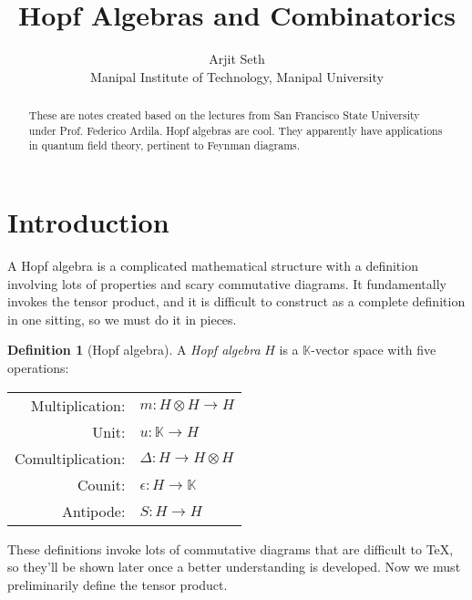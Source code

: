 \documentclass{article}
\theoremstyle{definition}
\newtheorem{Definition}{Definition}
\theoremstyle{remark}
\begin{document}
\title{\textbf{Hopf Algebras and Combinatorics}}

\author{\small Arjit Seth \\ \small Manipal Institute of Technology, Manipal University}
\date{}
\maketitle

\renewcommand{\abstractname}{Context}
\begin{abstract}
These are notes created based on the lectures from San Francisco State University under Prof. Federico Ardila. Hopf algebras are cool. They apparently have applications in quantum field theory, pertinent to Feynman diagrams.
\end{abstract}

\begingroup
\let\clearpage\relax
\tableofcontents
\endgroup

\medskip
\medskip

\section{Introduction}\label{sec:Intro}
A Hopf algebra is a complicated mathematical structure with a definition involving lots of properties and scary commutative diagrams. It fundamentally invokes the tensor product, and it is difficult to construct as a complete definition in one sitting, so we must do it in pieces.

\begin{Definition}[Hopf algebra]\label{def:HopfAlg}
A \emph{Hopf algebra} $H$ is a $\mathbb{K}$-vector space with five operations:
\begin{center}
\begin{tabular}{rl}
Multiplication: &   $ m\colon H \otimes H \to H$\\
Unit: & $u\colon \mathbb{K} \to H $ \\
Comultiplication: & 	$ \Delta\colon H \to H \otimes H$\\
Counit: & $\epsilon\colon H \to \mathbb{K}$ \\
Antipode: &  $ S\colon H \to H $
\end{tabular}
\end{center}
\end{Definition}

These definitions invoke lots of commutative diagrams that are difficult to \TeX, so they'll be shown later once a better understanding is developed. Now we must preliminarily define the tensor product.
\end{document}
